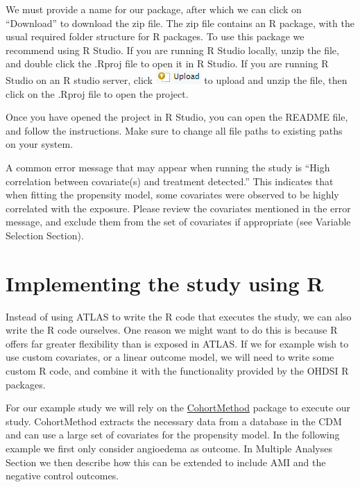 \documentclass[]{book}
\begin{document}
We must provide a name for our package, after which we can click on ``Download'' to download the zip file. The zip file contains an R package, with the usual required folder structure for R packages. \citep{Wickham_2015} To use this package we recommend using R Studio. If you are running R Studio locally, unzip the file, and double click the .Rproj file to open it in R Studio. If you are running R Studio on an R studio server, click \includegraphics{images/PopulationLevelEstimation/upload.png} to upload and unzip the file, then click on the .Rproj file to open the project.

Once you have opened the project in R Studio, you can open the README file, and follow the instructions. Make sure to change all file paths to existing paths on your system.

A common error message that may appear when running the study is ``High correlation between covariate(s) and treatment detected.'' This indicates that when fitting the propensity model, some covariates were observed to be highly correlated with the exposure. Please review the covariates mentioned in the error message, and exclude them from the set of covariates if appropriate (see Variable Selection Section). 

\hypertarget{pleR}{%
\section{Implementing the study using R}\label{pleR}}

Instead of using ATLAS to write the R code that executes the study, we can also write the R code ourselves. One reason we might want to do this is because R offers far greater flexibility than is exposed in ATLAS. If we for example wish to use custom covariates, or a linear outcome model, we will need to write some custom R code, and combine it with the functionality provided by the OHDSI R packages.

For our example study we will rely on the \href{https://ohdsi.github.io/CohortMethod/}{CohortMethod} package to execute our study. CohortMethod extracts the necessary data from a database in the CDM and can use a large set of covariates for the propensity model. In the following example we first only consider angioedema as outcome. In Multiple Analyses Section we then describe how this can be extended to include AMI and the negative control outcomes.
\end{document}

